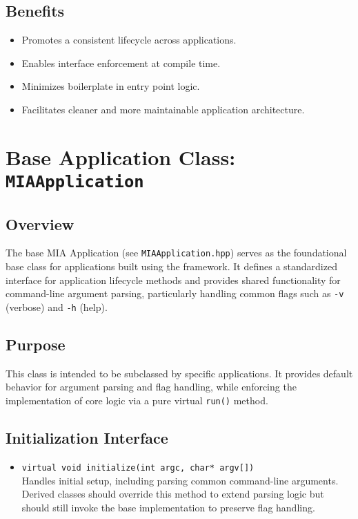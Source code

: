 \subsection*{Benefits}
\begin{itemize}
	\item Promotes a consistent lifecycle across applications.
	\item Enables interface enforcement at compile time.
	\item Minimizes boilerplate in entry point logic.
	\item Facilitates cleaner and more maintainable application architecture.
\end{itemize}











\section{Base Application Class: \texttt{MIAApplication}}
\label{sec:base-application}

\subsection*{Overview}
The base MIA Application (see \texttt{MIAApplication.hpp}) serves as the foundational base class for applications built using the framework. It defines a standardized interface for application lifecycle methods and provides shared functionality for command-line argument parsing, particularly handling common flags such as \texttt{-v} (verbose) and \texttt{-h} (help).

\subsection*{Purpose}
This class is intended to be subclassed by specific applications. It provides default behavior for argument parsing and flag handling, while enforcing the implementation of core logic via a pure virtual \texttt{run()} method.

\subsection*{Initialization Interface}
\begin{itemize}
	\item \texttt{virtual void initialize(int argc, char* argv[])} \\
	Handles initial setup, including parsing common command-line arguments. 
	Derived classes should override this method to extend parsing logic but should still invoke the base implementation to preserve flag handling.
\end{itemize}

